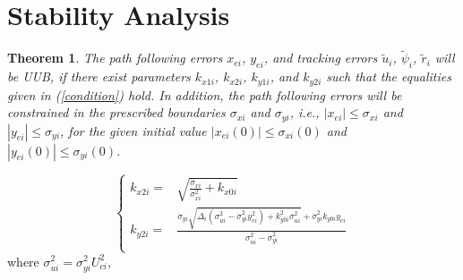 \documentclass[conference,letterpaper,10.5pt]{IEEEtran}
\newtheorem{theorem}{Theorem}
\begin{document}
\section{Stability Analysis}

\begin{theorem}
	The path following errors $x_{ei}$, $y_{ei}$, and tracking errors $\tilde{u}_i$, $\tilde{\psi}_i$, $\tilde{r}_i$ will be UUB, if there exist parameters $k_{x1i}$, $k_{x2i}$, $k_{y1i}$, and $k_{y2i}$ such that the equalities given in (\ref{condition}) hold. In addition, the path following errors will be constrained in the prescribed boundaries $\sigma_{xi}$ and $\sigma_{yi}$, i.e., $\left|x_{ei}\right|\leq \sigma_{xi}$ and $\left|y_{ei}\right|\leq \sigma_{yi}$,  for the given initial value $\left|x_{ei}(0)\right|\leq \sigma_{xi}(0)$ and $\left|y_{ei}(0)\right|\leq \sigma_{yi}(0)$. \end{theorem}

\begin{equation}\label{condition}
	\left\{
	\begin{aligned}
		k_{x2i}=&\sqrt{\frac{\dot{\sigma}_{xi}}{\sigma_{xi}^2}+k_{x0i}}\\
		k_{y2i}=&\frac{\dot{\sigma}_{yi}\sqrt{\Delta_i(\sigma^2_{ui}-\dot{\sigma}^2_{yi}y^2_{ei})+k^2_{y0i}\sigma^2_{ui}}+\dot{\sigma}^2_{yi}k_{y0i}y_{ei}}{\sigma^2_{ui}-\dot{\sigma}^2_{yi}}\\
	\end{aligned}
	\right.
\end{equation} 
where $\sigma^2_{ui}=\sigma^2_{yi}U^2_{ci}$, 
\end{document}
